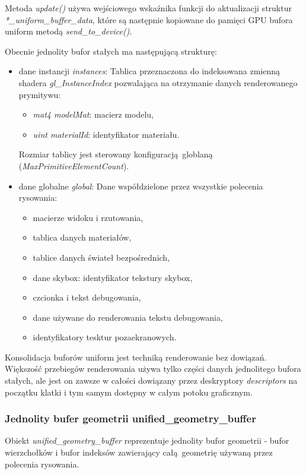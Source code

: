 Metoda \textit{update()} używa wejściowego wskaźnika funkcji do aktualizacji struktur \textit{*\_uniform\_buffer\_data}, które są następnie kopiowane do pamięci GPU bufora uniform metodą \textit{send\_to\_device()}.

Obecnie jednolity bufor stałych ma następującą strukturę:
\begin{itemize}
	\item dane instancji \textit{instances}:
	Tablica przeznaczona do indeksowana zmienną shadera \textit{gl\_InstanceIndex} pozwalająca na otrzymanie danych renderowanego prymitywu:
	\begin{itemize}
		\item \textit{mat4 modelMat}: macierz modelu,
		\item \textit{uint materialId}: identyfikator materiału.
	\end{itemize}
	Rozmiar tablicy jest sterowany konfiguracją globlaną (\textit{MaxPrimitiveElementCount}).
	
	\item dane globalne \textit{global}:
	Dane współdzielone przez wszystkie polecenia rysowania:
	\begin{itemize}
		\item macierze widoku i rzutowania,
		\item tablica danych materiałów,
		\item tablice danych świateł bezpośrednich,
		\item dane skybox: identyfikator tekstury skybox,
		\item czcionka i tekst debugowania,
		\item dane używane do renderowania tekstu debugowania,
		\item identyfikatory tesktur pozaekranowych.
	\end{itemize}
\end{itemize}

Konsolidacja buforów uniform jest techniką renderowanie bez dowiązań.
Większość przebiegów renderowania używa tylko części danych jednolitego bufora stałych, ale jest on zawsze w całości dowiązany przez deskryptory \textit{descriptors} na początku klatki i tym samym dostępny w całym potoku graficznym.


\subsubsection{Jednolity bufer geometrii unified\_geometry\_buffer}
Obiekt \textit{unified\_geometry\_buffer} reprezentuje jednolity bufor geometrii - bufor wierzchołków i bufor indeksów zawierający całą geometrię używaną przez polecenia rysowania.

